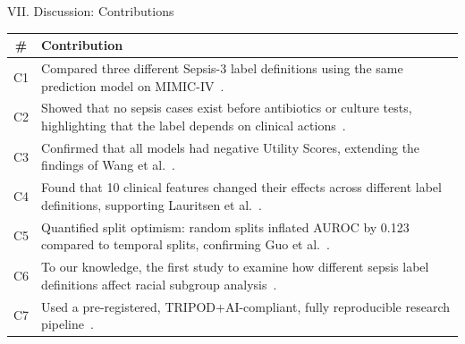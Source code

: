 \begin{frame}{VII. Discussion: Contributions}
\footnotesize\renewcommand{\arraystretch}{1.15}
\begin{center}
\begin{tabular}{cp{11cm}}
\toprule
\textbf{\#} & \textbf{Contribution} \\
\midrule
C1 & Compared three different Sepsis-3 label definitions using the same
     prediction model on MIMIC-IV~\cite{cohen2024subtle}. \\
C2 & Showed that no sepsis cases exist before antibiotics or culture tests,
     highlighting that the label depends on clinical
     actions~\cite{kamran2024evaluation}. \\
C3 & Confirmed that all models had negative Utility Scores, extending the
     findings of Wang et al.~\cite{wang2025srpm}. \\
C4 & Found that 10 clinical features changed their effects across different
     label definitions, supporting Lauritsen et
     al.~\cite{lauritsen2021framing}. \\
C5 & Quantified split optimism: random splits inflated AUROC by 0.123
     compared to temporal splits, confirming Guo et
     al.~\cite{guo2022temporal}. \\
C6 & To our knowledge, the first study to examine how different sepsis label
     definitions affect racial subgroup analysis~\cite{wang2022equity}. \\
C7 & Used a pre-registered, TRIPOD+AI-compliant, fully reproducible research
     pipeline~\cite{collins2024tripodai}. \\
\bottomrule
\end{tabular}
\end{center}
\end{frame}


